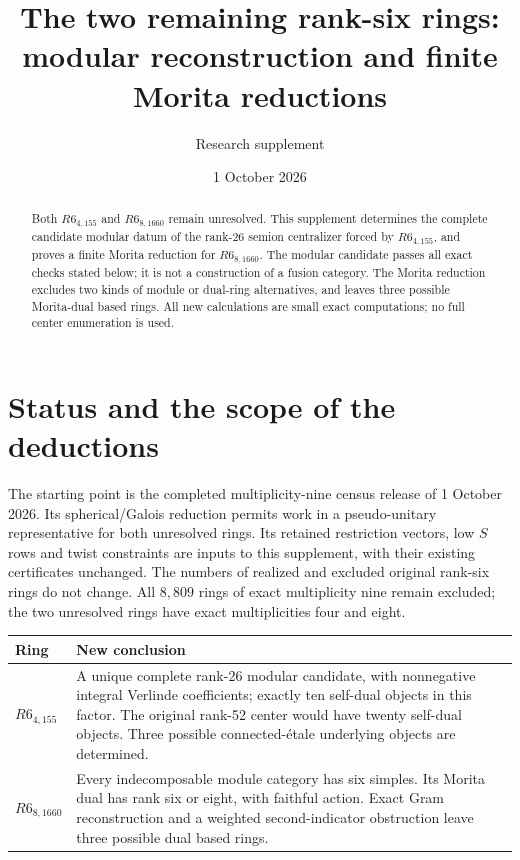 \documentclass[11pt]{article}
\title{The two remaining rank-six rings:\\modular reconstruction and finite Morita reductions}
\author{Research supplement}
\date{1 October 2026}
\begin{document}
\maketitle
\begin{abstract}
Both $R6_{4,155}$ and $R6_{8,1660}$ remain unresolved. This supplement
determines the complete candidate modular datum of the rank-26 semion
centralizer forced by $R6_{4,155}$, and proves a finite Morita reduction
for $R6_{8,1660}$. The modular candidate passes all exact checks stated
below; it is not a construction of a fusion category. The Morita
reduction excludes two kinds of module or dual-ring alternatives, and
leaves three possible Morita-dual based rings. All new calculations are
small exact computations; no full center enumeration is used.
\end{abstract}

\section{Status and the scope of the deductions}

The starting point is the completed multiplicity-nine census release
of 1 October 2026. Its spherical/Galois reduction permits work in a
pseudo-unitary representative for both unresolved rings. Its retained
restriction vectors, low $S$ rows and twist constraints are inputs to
this supplement, with their existing certificates unchanged.
The numbers of realized and excluded original rank-six rings do not
change. All $8{,}809$ rings of exact multiplicity nine remain excluded;
the two unresolved rings have exact multiplicities four and eight.

\begin{center}
\begin{tabular}{p{28mm}p{111mm}}
\toprule
Ring & New conclusion \\
\midrule
$R6_{4,155}$ & A unique complete rank-26 modular candidate, with
nonnegative integral Verlinde coefficients; exactly ten self-dual
objects in this factor. The original rank-52 center would have twenty
self-dual objects. Three possible connected-\'etale underlying objects
are determined. \\
$R6_{8,1660}$ & Every indecomposable module category has six simples.
Its Morita dual has rank six or eight, with faithful action. Exact
Gram reconstruction and a weighted second-indicator obstruction leave
three possible dual based rings. \\
\bottomrule
\end{tabular}
\end{center}
\end{document}
